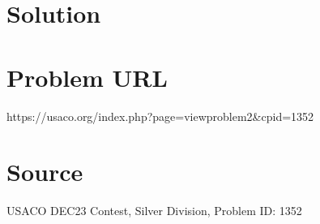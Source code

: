 \documentclass[12pt]{article}
\begin{document}
\section*{Solution}


\section*{Problem URL}
https://usaco.org/index.php?page=viewproblem2&cpid=1352

\section*{Source}
USACO DEC23 Contest, Silver Division, Problem ID: 1352
\end{document}
